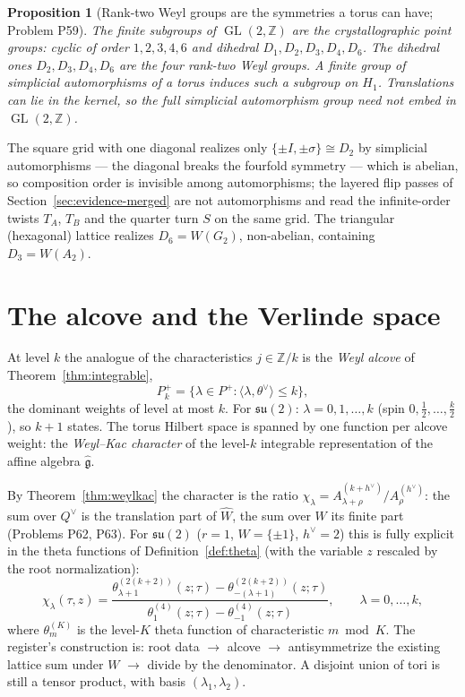 \documentclass[11pt]{article}
\newtheorem{proposition}[theorem]{Proposition}
\theoremstyle{definition}
\theoremstyle{remark}
\newcommand{\Z}{\mathbb{Z}}
\newcommand{\GL}{\operatorname{GL}}
\begin{document}
\begin{proposition}[Rank-two Weyl groups are the symmetries a torus can have; Problem P59]
\label{prop:pointgroups}
The finite subgroups of $\GL(2,\Z)$ are the crystallographic point groups:
cyclic of order $1,2,3,4,6$ and dihedral $D_1,D_2,D_3,D_4,D_6$. The dihedral
ones $D_2,D_3,D_4,D_6$ are the four rank-two Weyl groups. A finite group of
simplicial automorphisms of a torus induces such a subgroup on $H_1$.
Translations can lie in the kernel, so the full simplicial automorphism
group need not embed in $\GL(2,\Z)$.
\end{proposition}

The square grid with one diagonal realizes only $\{\pm I,\pm\sigma\}\cong D_2$
by simplicial automorphisms --- the diagonal breaks the fourfold symmetry
--- which is abelian, so composition order is invisible among
automorphisms; the layered flip passes of Section~\ref{sec:evidence-merged}
are not automorphisms and read the infinite-order twists $T_A$, $T_B$ and
the quarter turn $S$ on the same grid. The triangular (hexagonal) lattice
realizes $D_6 = W(G_2)$, non-abelian, containing $D_3 = W(A_2)$.

\section{The alcove and the Verlinde space}\label{sec:alcove}

At level $k$ the analogue of the characteristics $j\in\Z/k$ is the
\emph{Weyl alcove} of Theorem~\ref{thm:integrable},
\[
  P_k^+ = \{\lambda\in P^+ : \langle\lambda,\theta^\vee\rangle \le k\},
\]
the dominant weights of level at most $k$. For $\mathfrak{su}(2)$:
$\lambda = 0,1,\dots,k$ (spin $0,\tfrac12,\dots,\tfrac k2$), so $k+1$ states.
The torus Hilbert space is spanned by one function per alcove weight: the
\emph{Weyl--Kac character} of the level-$k$ integrable representation of the
affine algebra $\hat{\mathfrak g}$.

By Theorem~\ref{thm:weylkac} the character is the ratio
$\chi_\lambda = A^{(k+h^\vee)}_{\lambda+\rho}/A^{(h^\vee)}_{\rho}$: the sum
over $Q^\vee$ is the translation part of $\hat W$, the sum over $W$ its
finite part (Problems P62, P63). For $\mathfrak{su}(2)$ ($r=1$, $W=\{\pm1\}$, $h^\vee = 2$) this is fully
explicit in the theta functions of Definition~\ref{def:theta} (with the
variable $z$ rescaled by the root normalization):
\[
  \chi_\lambda(\tau,z) = \frac{\theta^{(2(k+2))}_{\lambda+1}(z;\tau)
      - \theta^{(2(k+2))}_{-(\lambda+1)}(z;\tau)}
     {\theta^{(4)}_{1}(z;\tau) - \theta^{(4)}_{-1}(z;\tau)},
  \qquad \lambda = 0,\dots,k,
\]
where $\theta^{(K)}_m$ is the level-$K$ theta function of characteristic
$m \bmod K$. The register's construction is: root data $\to$ alcove $\to$
antisymmetrize the existing lattice sum under $W$ $\to$ divide by the
denominator. A disjoint union of tori is still a tensor product, with basis
$(\lambda_1,\lambda_2)$.
\end{document}
